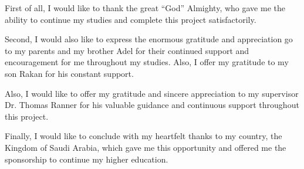 First of all, I would like to thank the great “God” Almighty, who gave me the ability to continue my studies and complete this project satisfactorily.

Second, I would also like to express the enormous gratitude and appreciation go to my parents and my brother Adel for their continued support and encouragement for me throughout my studies. Also, I offer my gratitude to my son Rakan for his constant support. 

Also, I would like to offer my gratitude and sincere appreciation to my supervisor Dr. Thomas Ranner for his valuable guidance and continuous support throughout this project.

Finally, I would like to conclude with my heartfelt thanks to my country, the Kingdom of Saudi Arabia, which gave me this opportunity and offered me the sponsorship to continue my higher education.